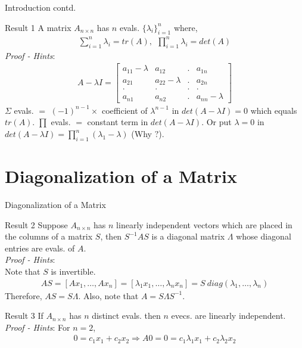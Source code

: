 \documentclass{beamer}
\begin{document}
\begin{frame}{Introduction contd.}
\begin{block}{Result 1}
A matrix $A_{n\times n}$ has $n$ evals. $\{\lambda_i\}_{i=1}^{n}$ where,\\
\begin{align*}
    \sum_{i=1}^{n}\lambda_i = tr(A),\ \ \prod_{i=1}^{n}\lambda_i = det(A)
\end{align*}
\textit{Proof - Hints}:
\begin{align*}
    A-\lambda I = \begin{bmatrix}a_{11}-\lambda&a_{12}&.&a_{1n}\\
                                a_{21}&a_{22}-\lambda&.&a_{2n}\\
                                .&.&.&.\\
                                a_{n1}&a_{n2}&.&a_{nn}-\lambda\end{bmatrix}
\end{align*}
$\Sigma$ evals. $=$ $(-1)^{n-1} \times $ coefficient of $\lambda^{n-1}$ in $det(A-\lambda I) = 0$ which equals $tr(A)$. $\prod$ evals. $=$  constant term in $det(A-\lambda I)$. Or put $\lambda = 0$ in $det(A-\lambda I) = \prod_{i=1}^{n}(\lambda_1-\lambda)$ (Why $?$).
\end{block}
\end{frame}

\section{Diagonalization of a Matrix}

\begin{frame}{Diagonalization of a Matrix}
\begin{block}{Result 2}
Suppose $A_{n\times n}$ has $n$ linearly independent vectors which are placed in the columns of a matrix $S$, then $S^{-1}AS$ is a diagonal matrix $\Lambda$ whose diagonal entries are evals. of $A$.\\
\textit{Proof - Hints}:\\
Note that $S$ is invertible.
\begin{align*}
    AS = [Ax_1,\ldots,Ax_n] = [\lambda_1x_1,\ldots,\lambda_nx_n] = S \ diag(\lambda_1,\ldots,\lambda_n)
\end{align*}
Therefore, $AS = S \Lambda$. Also, note that $A = S\Lambda S^{-1}$.
\end{block}
\begin{block}{Result 3}
If $A_{n\times n}$ has $n$ distinct evals. then $n$ evecs. are linearly independent.\\
\textit{Proof - Hints}: For $n=2$,
\begin{align*}
    0 = c_1x_1 + c_2x_2 \Rightarrow A0 = 0 = c_1\lambda_1x_1 + c_2\lambda_2x_2
\end{align*}
\end{block}
\end{frame}
\end{document}
